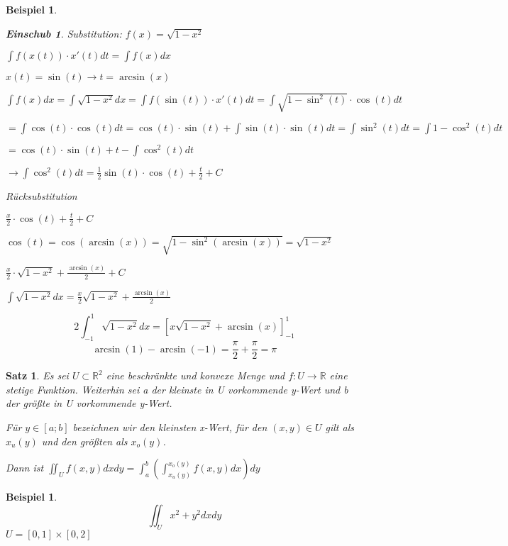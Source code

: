 \documentclass[fontset=ubuntu,12pt,a4paper]{scrreprt}
\newtheorem{beispiel}[defi]{Beispiel}
\newtheorem{satz}[defi]{Satz}
\newtheorem*{einschub}{Einschub}
\begin{document}
\begin{beispiel}
\begin{enumerate}[label=\emph{(\roman*)}]
        \begin{einschub}
            Substitution: \(f(x)=\sqrt{1-x^2}\)

            \(\int f(x(t))\cdot x'(t)dt=\int f(x)dx\)
            
            \(x(t)=\sin(t) \to t=\arcsin(x)\)

            \(\int f(x)dx=\int \sqrt{1-x^2}dx=\int f(\sin(t))\cdot x'(t)dt=\int \sqrt{1-\sin^2(t)}\cdot\cos(t)dt\)

            \(=\int \cos(t)\cdot\cos(t)dt=\cos(t)\cdot\sin(t)+\int \sin(t)\cdot\sin(t)dt=\int \sin^2(t)dt=\int 1-\cos^2(t)dt\)

            \(=\cos(t)\cdot\sin(t)+t-\int \cos^2(t)dt\)

            \(\to \int \cos^2(t)dt=\frac{1}{2}\sin(t)\cdot\cos(t)+\frac{t}{2}+C\)

            Rücksubstitution

            \(\frac{x}{2}\cdot\cos(t)+\frac{t}{2}+C\)

            \(\cos(t)=\cos(\arcsin(x))=\sqrt{1-\sin^2(\arcsin(x))}=\sqrt{1-x^2}\)

            \(\frac{x}{2}\cdot\sqrt{1-x^2}+\frac{\arcsin(x)}{2}+C\)

            \(\int \sqrt{1-x^2}dx=\frac{x}{2}\sqrt{1-x^2}+\frac{\arcsin(x)}{2}\)
        \end{einschub}
        \[2\int_{-1}^1 \sqrt{1-x^2}dx={\left[x\sqrt{1-x^2}+\arcsin(x)\right]}^1_{-1}\]
        \[\arcsin(1)-\arcsin(-1)=\frac{\pi}{2}+\frac{\pi}{2}=\pi\]
        \end{enumerate}
    \end{beispiel}

    \begin{satz}
        Es sei \(U\subset\mathbb{R}^2\) eine beschränkte und konvexe Menge und \(f:U\to\mathbb{R}\) eine stetige Funktion. Weiterhin sei a der kleinste in U vorkommende y-Wert und b der größte in U vorkommende y-Wert.

        Für \(y\in[a;b]\) bezeichnen wir den kleinsten x-Wert, für den \((x,y)\in U\) gilt als \(x_u(y)\) und den größten als \(x_o(y)\).

        Dann ist \(\iint_U f(x,y)dxdy=\int_a^b \left(\int_{x_u(y)}^{x_o(y)} f(x,y)dx\right)dy\)
    \end{satz}

    \begin{beispiel}
        \[\iint_U x^2+y^2dxdy\] \(U=\left[0,1\right]\times\left[0,2\right]\)

    \end{beispiel}
\end{document}

